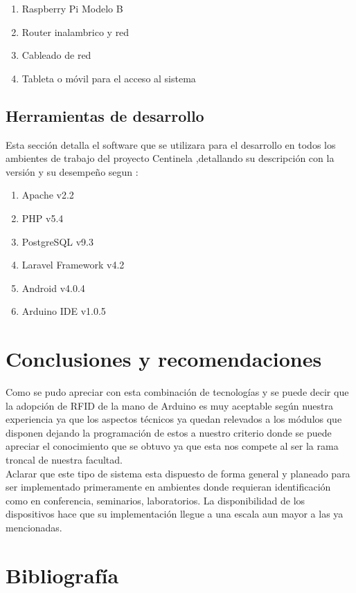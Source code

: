 \documentclass[11pt,twocolumn]{article}
\begin{document}
	\begin{enumerate}
		\item Raspberry Pi Modelo B 
		\item Router inalambrico y red
		\item Cableado de red 
		\item Tableta o m\'ovil para el acceso al sistema
	\end{enumerate}
	
	\subsection{Herramientas de desarrollo}
	
	Esta secci\'on detalla el software que se utilizara para el desarrollo en todos los ambientes de trabajo del proyecto Centinela ,detallando su descripci\'on con la versi\'on y su desempe\~no segun :
	
	\begin{enumerate}
		\item Apache v2.2
		\item PHP v5.4
		\item PostgreSQL v9.3
		\item Laravel Framework v4.2
		\item Android v4.0.4
		\item Arduino IDE v1.0.5
	\end{enumerate}

\section{Conclusiones y recomendaciones}
Como se pudo apreciar con esta combinaci\'on de tecnolog\'ias y se puede decir que la adopci\'on de RFID de la mano de Arduino es muy aceptable seg\'un nuestra experiencia ya que los  aspectos t\'ecnicos ya quedan relevados a los m\'odulos que disponen dejando la programaci\'on de estos a nuestro criterio donde se puede apreciar el conocimiento que se obtuvo ya que esta nos compete al ser la rama troncal de nuestra facultad. \\
	
Aclarar que este tipo de sistema esta dispuesto de forma general y planeado para ser implementado primeramente en ambientes donde requieran identificaci\'on como en conferencia, seminarios, laboratorios. La disponibilidad de los dispositivos hace que su implementaci\'on llegue a una escala aun mayor a las ya mencionadas.
\section{Bibliograf\'ia}
	
\end{document}
